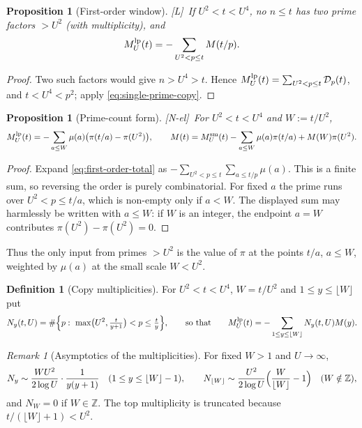 \documentclass[11pt]{amsart}
\numberwithin{equation}{section}
\theoremstyle{plain}
\newtheorem{proposition}[theorem]{Proposition}
\theoremstyle{definition}
\newtheorem{definition}[theorem]{Definition}
\theoremstyle{remark}
\newtheorem{remark}[theorem]{Remark}
\newcommand{\tagNE}{\textup{[N-el]}}
\newcommand{\tagL}{\textup{[L]}}
\begin{document}
\begin{proposition}[First-order window]
\label{prop:linear-new-primes}
\tagL\ If $U^2<t<U^4$, no $n\le t$ has two prime factors $>U^2$ (with
multiplicity), and
\begin{equation}
\label{eq:first-order-total}
  M^{\rm lp}_U(t)=-\sum_{U^2<p\le t}M(t/p).
\end{equation}
\end{proposition}

\begin{proof}
Two such factors would give $n>U^4>t$. Hence $M^{\rm lp}_U(t)=\sum_{U^2<p\le t}
\mathcal D_p(t)$, and $t<U^4<p^2$; apply \eqref{eq:single-prime-copy}.
\end{proof}

\begin{proposition}[Prime-count form]
\label{prop:prime_count_form}
\tagNE\ For $U^2<t<U^4$ and $W:=t/U^2$,
\begin{equation}
\label{eq:prime_count_form}
  M^{\rm lp}_U(t)=-\sum_{a\le W}\mu(a)\bigl(\pi(t/a)-\pi(U^2)\bigr),
  \qquad
  M(t)=M^{\rm sm}_U(t)-\sum_{a\le W}\mu(a)\pi(t/a)+M(W)\pi(U^2).
\end{equation}
\end{proposition}

\begin{proof}
Expand \eqref{eq:first-order-total} as
$-\sum_{U^2<p\le t}\sum_{a\le t/p}\mu(a)$.  This is a finite sum, so
reversing the order is purely combinatorial.  For fixed $a$ the prime runs
over $U^2<p\le t/a$, which is non-empty only if $a<W$.  The displayed sum
may harmlessly be written with $a\le W$: if $W$ is an integer, the endpoint
$a=W$ contributes $\pi(U^2)-\pi(U^2)=0$.
\end{proof}

Thus the only input from primes $>U^2$ is the value of $\pi$ at the points
$t/a$, $a\le W$, weighted by $\mu(a)$ at the small scale $W<U^2$.

\begin{definition}[Copy multiplicities]
\label{def:copy-multiplicity}
For $U^2<t<U^4$, $W=t/U^2$ and $1\le y\le\lfloor W\rfloor$ put
\begin{equation}
\label{eq:Ny-exact}
  N_y(t,U)=\#\Bigl\{p:\ \max\bigl(U^2,\tfrac{t}{y+1}\bigr)<p\le\tfrac ty\Bigr\},
  \qquad\text{so that}\qquad
  M^{\rm lp}_U(t)=-\sum_{1\le y\le\lfloor W\rfloor}N_y(t,U)M(y).
\end{equation}
\end{definition}

\begin{remark}[Asymptotics of the multiplicities]
\label{rem:copy-count-asymptotic}
For fixed $W>1$ and $U\to\infty$,
\begin{equation}
\label{eq:Ny-fixed-W}
  N_y\sim\frac{WU^2}{2\log U}\cdot\frac1{y(y+1)}\quad(1\le y\le\lfloor W\rfloor-1),
  \qquad
  N_{\lfloor W\rfloor}\sim\frac{U^2}{2\log U}\Bigl(\frac W{\lfloor W\rfloor}-1\Bigr)
  \quad(W\notin\mathbb{Z}),
\end{equation}
and $N_W=0$ if $W\in\mathbb{Z}$. The top multiplicity is truncated because
$t/(\lfloor W\rfloor+1)<U^2$.
\end{remark}
\end{document}
